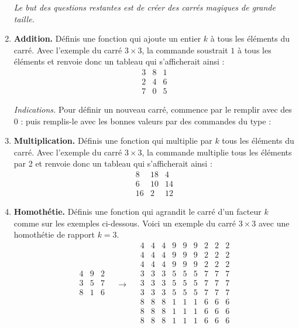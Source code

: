 \documentclass[11pt,class=report,crop=false]{standalone}
\begin{document}
\begin{activite}
\begin{enumerate}
 
 \medskip
	
  \emph{Le but des questions restantes est de créer des carrés magiques de grande taille.}
	 
  
  \item \textbf{Addition.} Définis une fonction 
  qui ajoute un entier $k$ à tous les éléments du carré. Avec l'exemple du carré $3\times 3$, la commande  soustrait $1$ à tous les éléments et renvoie donc un tableau qui s'afficherait ainsi :
$$\begin{array}{ccc}
3&8&1\\2&4&6\\7&0&5
\end{array}$$  

\emph{Indications.} Pour définir un nouveau carré, commence par le remplir avec des $0$ :
puis remplis-le avec les bonnes valeurs par des commandes du type :

  \item \textbf{Multiplication.} Définis une fonction 
  qui multiplie par $k$ tous les éléments du carré. Avec l'exemple du carré $3\times 3$, la commande  multiplie tous les éléments par $2$ et renvoie donc un tableau qui s'afficherait ainsi :
$$\begin{array}{ccc}
8&18&4\\6&10&14\\16&2&12
\end{array}$$ 
  
  \item \textbf{Homothétie.} Définis une fonction 
  qui agrandit le carré d'un facteur $k$ comme sur les exemples ci-dessous. 
  Voici un exemple du carré $3 \times 3$ avec une homothétie de rapport $k=3$.
 $$
  \begin{array}{c|c|c}  
  4& 9& 2\\\hline
  3& 5& 7\\\hline
  8& 1& 6\\  
  \end{array} 
\quad  \longrightarrow\quad
  \begin{array}{ccc|ccc|ccc}  
  4& 4& 4& 9& 9& 9& 2& 2& 2\\
  4& 4& 4& 9& 9& 9& 2& 2& 2\\ 
  4& 4& 4& 9& 9& 9& 2& 2& 2\\\hline
  3& 3& 3& 5& 5& 5& 7& 7& 7\\
  3& 3& 3& 5& 5& 5& 7& 7& 7\\
  3& 3& 3& 5& 5& 5& 7& 7& 7\\\hline
  8& 8& 8& 1& 1& 1& 6& 6& 6\\
  8& 8& 8& 1& 1& 1& 6& 6& 6\\
  8& 8& 8& 1& 1& 1& 6& 6& 6 \\
  \end{array}
$$
  

\end{enumerate}
\end{activite}
\end{document}
